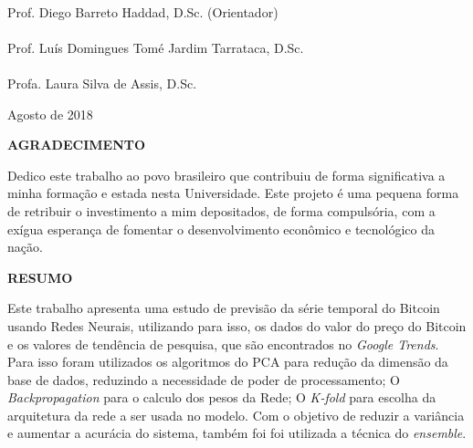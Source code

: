 {\center
\HRule \\
Prof. Diego Barreto Haddad, D.Sc. (Orientador) \\[0.4cm]
\HRule \\
Prof. Luís Domingues Tomé Jardim Tarrataca, D.Sc.\\[0.4cm]
\HRule \\
Profa. Laura Silva de Assis, D.Sc.  \\[1.5cm]


\begin{center}
{Agosto de 2018}
\end{center}


}



\newpage


%



\begin{center}
\textbf{\large  AGRADECIMENTO}
\end{center}
      \vspace{0.5cm}

Dedico este trabalho ao povo brasileiro que contribuiu de forma significativa a minha formação e estada nesta Universidade. Este projeto é uma pequena forma de retribuir o investimento a mim depositados, de forma compulsória, com a exígua esperança de fomentar o desenvolvimento econômico e tecnológico da nação.



\newpage


\begin{center}
\textbf{\large RESUMO}
\end{center}
      \vspace{0.5cm}
      
 Este trabalho apresenta uma estudo de previsão da série temporal do Bitcoin usando Redes Neurais, utilizando para isso, os dados do valor do preço do Bitcoin e os valores de tendência de pesquisa, que são encontrados no \textit{Google Trends}. Para isso foram utilizados os algoritmos do PCA para redução da dimensão da base de dados, reduzindo a necessidade de poder de processamento; O \textit{Backpropagation} para o calculo dos pesos da Rede; O \textit{K-fold} para escolha da arquitetura da rede a ser usada no modelo. Com o objetivo de reduzir a variância e aumentar a acurácia do sistema, também foi foi utilizada a técnica do \textit{ensemble}.

